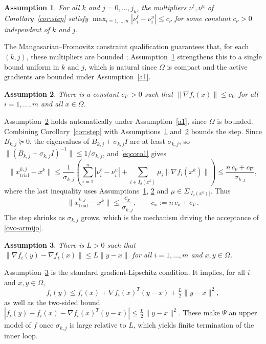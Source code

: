 \documentclass[11pt]{article}
\newcommand{\xkjtrial}{x^{k,j}_{\mathrm{trial}}}
\newtheorem{assumption}{Assumption}
\begin{document}
\begin{assumption} \label{a2}
For all $k$ and $j = 0, \ldots, j_k$, the multipliers $\nu^\ell, \nu^u$ of
Corollary~\ref{cor:step} satisfy
$\max_{i = 1, \ldots, n} |\nu^\ell_i - \nu^u_i| \leq c_\nu$ for some constant
$c_\nu > 0$ independent of $k$ and $j$.
\end{assumption}

The Mangasarian--Fromovitz constraint qualification guarantees that, for each
$(k,j)$, these multipliers are bounded \cite{gauvin}; Assumption~\ref{a2}
strengthens this to a single bound uniform in $k$ and $j$, which is natural
since $\Omega$ is compact and the active gradients are bounded under
Assumption~\ref{a1}.

\begin{assumption} \label{a3}
There is a constant $c_\nabla > 0$ such that $\|\nabla f_i(x)\| \leq c_\nabla$
for all $i = 1, \ldots, m$ and all $x \in \Omega$.
\end{assumption}

Assumption~\ref{a3} holds automatically under Assumption~\ref{a1}, since
$\Omega$ is bounded. Combining Corollary~\ref{cor:step} with
Assumptions~\ref{a2} and~\ref{a3} bounds the step. Since $B_{k,j} \succeq 0$,
the eigenvalues of $B_{k,j} + \sigma_{k,j} I$ are at least $\sigma_{k,j}$, so
$\|(B_{k,j} + \sigma_{k,j} I)^{-1}\| \leq 1/\sigma_{k,j}$, and \eqref{eqcoro1}
gives
\[
\|\xkjtrial - x^k\| \leq \frac{1}{\sigma_{k,j}}
\left( \sum_{i=1}^n |\nu^\ell_i - \nu^u_i|
+ \sum_{i \in I_\delta(x^k)} \mu_i \|\nabla f_i(x^k)\| \right)
\leq \frac{n\,c_\nu + c_\nabla}{\sigma_{k,j}},
\]
where the last inequality uses Assumptions~\ref{a2}, \ref{a3} and
$\mu \in \Sigma_{|I_\delta(x^k)|}$. Thus
\begin{equation} \label{ccotasub}
\|\xkjtrial - x^k\| \leq \frac{c_x}{\sigma_{k,j}}, \qquad
c_x := n\,c_\nu + c_\nabla.
\end{equation}
The step shrinks as $\sigma_{k,j}$ grows, which is the mechanism driving the
acceptance of \eqref{ovo-armijo}.

\begin{assumption} \label{a4}
There is $L > 0$ such that $\|\nabla f_i(y) - \nabla f_i(x)\| \leq L \|y - x\|$
for all $i = 1, \ldots, m$ and $x, y \in \Omega$.
\end{assumption}

Assumption~\ref{a4} is the standard gradient-Lipschitz condition. It implies,
for all $i$ and $x, y \in \Omega$,
\begin{equation} \label{taylor}
f_i(y) \leq f_i(x) + \nabla f_i(x)^T(y - x) + \tfrac{L}{2}\|y - x\|^2,
\end{equation}
as well as the two-sided bound
$|f_i(y) - f_i(x) - \nabla f_i(x)^T(y - x)| \leq \tfrac{L}{2}\|y - x\|^2$. These
make $\Psi$ an upper model of $f$ once $\sigma_{k,j}$ is large relative to $L$,
which yields finite termination of the inner loop. 
\end{document}

